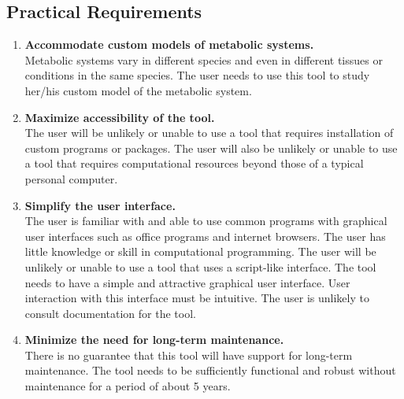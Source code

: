 

\subsection{Practical Requirements}

\begin{enumerate}

\item \textbf{Accommodate custom models of metabolic systems.}
\\ Metabolic systems vary in different species and even in different tissues or conditions in the same species.
The user needs to use this tool to study her/his custom model of the metabolic system.

\item \textbf{Maximize accessibility of the tool.}
\\ The user will be unlikely or unable to use a tool that requires installation of custom programs or packages.
The user will also be unlikely or unable to use a tool that requires computational resources beyond those of a typical personal computer.

\item \textbf{Simplify the user interface.}
\\ The user is familiar with and able to use common programs with graphical user interfaces such as office programs and internet browsers.
The user has little knowledge or skill in computational programming.
The user will be unlikely or unable to use a tool that uses a script-like interface.
The tool needs to have a simple and attractive graphical user interface.
User interaction with this interface must be intuitive.
The user is unlikely to consult documentation for the tool.

\item \textbf{Minimize the need for long-term maintenance.}
\\ There is no guarantee that this tool will have support for long-term maintenance.
The tool needs to be sufficiently functional and robust without maintenance for a period of about 5 years.

\end{enumerate}

